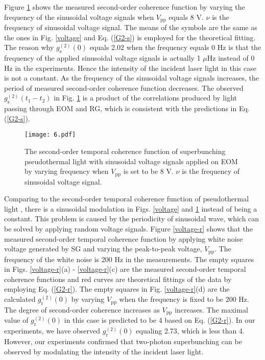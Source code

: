 \documentclass[12pt]{iopart}
\begin{document}
Figure \ref{frequency-s} shows the measured second-order coherence function by varying the frequency of the sinusoidal voltage signals when  $V_{\text{pp}}$ equals 8 V. $\nu$ is the frequency of sinusoidal voltage signal. The means of the symbols are the same as the ones in Fig. \ref{voltage} and Eq. (\ref{G2-s}) is employed for the theoretical fitting. The reason why $g^{(2)}_\text{s}(0)$ equals 2.02 when the frequency equals 0 Hz is that the frequency of the applied sinusoidal voltage signals is actually 1 $\mu$Hz instead of 0 Hz in the experiments. Hence the intensity of the incident laser light in this case is not a constant. As the frequency of the sinusoidal voltage signals increases, the period of measured second-order coherence function decreases. The observed $g^{(2)}_\text{s}(t_1-t_2)$ in Fig. \ref{frequency-s} is a product of the correlations produced by light passing through EOM and RG, which is consistent with the predictions in Eq. (\ref{G2-s}).

\begin{figure}[htbp]
\centering
\texttt{[image: 6.pdf]}
\caption{The second-order temporal coherence function of superbunching pseudothermal light with sinusoidal voltage signals applied on EOM by varying frequency when $V_{\text{pp}}$ is set to be 8 V. $\nu$ is the frequency of sinusoidal voltage signal.}\label{frequency-s}
\end{figure}

Comparing to the second-order temporal coherence function of pseudothermal light \cite{martienssen}, there is a sinusoidal modulation in Figs. \ref{voltage} and \ref{frequency-s} instead of being a constant. This problem is caused by the periodicity of sinusoidal wave, which can be solved by applying random voltage signals. Figure \ref{voltage-r} shows that the measured second-order temporal coherence function by applying white noise voltage generated by SG and varying the peak-to-peak voltage, $V_{\text{pp}}$. The frequency of the white noise is 200 Hz in the measurements. The empty squares in Figs. \ref{voltage-r}(a) - \ref{voltage-r}(c) are the measured second-order temporal coherence functions and red curves are theoretical fittings of the data by employing Eq. (\ref{G2-r}). The empty squares in Fig. \ref{voltage-r}(d) are the calculated $g^{(2)}_\text{r}(0)$ by varying $V_{\text{pp}}$ when the frequency is fixed to be 200 Hz. The degree of second-order coherence increases as $V_{\text{pp}}$ increases. The maximal value of  $g^{(2)}_\text{r}(0)$ in this case is predicted to be 4 based on Eq. (\ref{G2-r}). In our experiments, we have observed $g^{(2)}_\text{r}(0)$ equaling 2.73, which is less than 4. However, our experiments confirmed that two-photon superbunching can be observed by modulating the intensity of the incident laser light.
\end{document}
